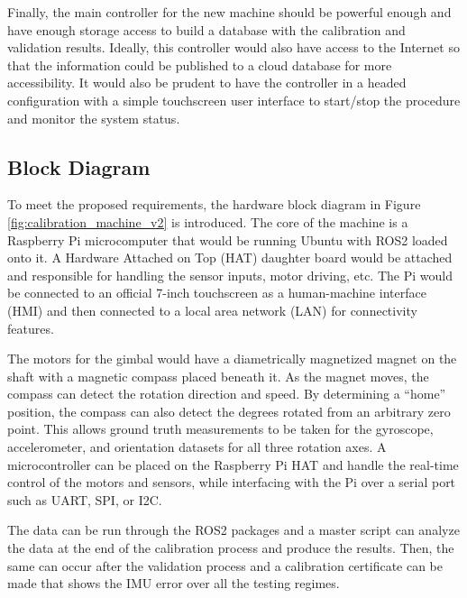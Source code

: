 Finally, the main controller for the new machine should be powerful enough and have enough storage access to build a database with the calibration and validation results.
Ideally, this controller would also have access to the Internet so that the information could be published to a cloud database for more accessibility.
It would also be prudent to have the controller in a headed configuration with a simple touchscreen user interface to start/stop the procedure and monitor the system status.

\subsection{Block Diagram} 
To meet the proposed requirements, the hardware block diagram in Figure \ref{fig:calibration_machine_v2} is introduced.
The core of the machine is a Raspberry Pi microcomputer that would be running Ubuntu with ROS2 loaded onto it.
A Hardware Attached on Top (HAT) daughter board would be attached and responsible for handling the sensor inputs, motor driving, etc.
The Pi would be connected to an official 7-inch touchscreen as a human-machine interface (HMI) and then connected to a local area network (LAN) for connectivity features.

The motors for the gimbal would have a diametrically magnetized magnet on the shaft with a magnetic compass placed beneath it.
As the magnet moves, the compass can detect the rotation direction and speed.
By determining a ``home'' position, the compass can also detect the degrees rotated from an arbitrary zero point.
This allows ground truth measurements to be taken for the gyroscope, accelerometer, and orientation datasets for all three rotation axes.
A microcontroller can be placed on the Raspberry Pi HAT and handle the real-time control of the motors and sensors, while interfacing with the Pi over a serial port such as UART, SPI, or I2C.


The data can be run through the ROS2 packages and a master script can analyze the data at the end of the calibration process and produce the results.
Then, the same can occur after the validation process and a calibration certificate can be made that shows the IMU error over all the testing regimes.


